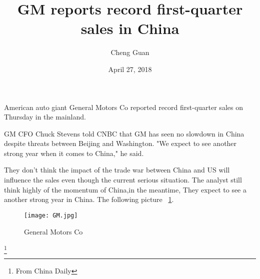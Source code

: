 \documentclass[12pt]{article}
\begin{document}
\title{GM reports record first-quarter sales in China}
\author{Cheng Guan}
\date{April 27, 2018}
\maketitle
\setlength{\baselineskip}{20pt}

     American auto giant General Motors Co reported record first-quarter sales
   on Thursday in the mainland.

   GM CFO Chuck Stevens told CNBC that GM has seen no slowdown in China
   despite threats  between Beijing and Washington.
  "We expect to see another strong year when it comes to China," he said.\cite{test2}

     They don't think the impact of the trade war between China and US will
     influence the sales even though the current serious situation.
      The analyst still think highly of the momentum of China,in the meantime,
      They expect to see a another strong year in China. The following picture ~\ref{fig1}.

 \begin{figure}[ht]
 \centering
 \texttt{[image: GM.jpg]}
 \caption{General Motors Co}
 \label{fig1}
\end{figure}


  \footnote{\centering From China Daily}
\end{document}
